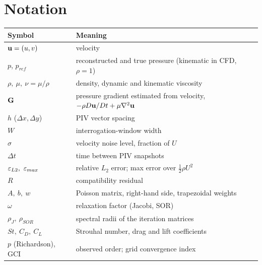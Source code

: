 \chapter{Notation}
\begin{table}[H]\centering\small
\begin{tabular}{@{}ll@{}}\toprule
Symbol & Meaning\\\midrule
$\mathbf{u}=(u,v)$ & velocity\\
$p$, $p_{ref}$ & reconstructed and true pressure (kinematic in CFD, $\rho=1$)\\
$\rho,\ \mu,\ \nu=\mu/\rho$ & density, dynamic and kinematic viscosity\\
$\mathbf{G}$ & pressure gradient estimated from velocity, $-\rho D\mathbf{u}/Dt+\mu\nabla^2\mathbf{u}$\\
$h$ ($\Delta x,\Delta y$) & PIV vector spacing\\
$W$ & interrogation-window width\\
$\sigma$ & velocity noise level, fraction of $U$\\
$\Delta t$ & time between PIV snapshots\\
$\eps_{L2},\ \eps_{max}$ & relative $L_2$ error; max error over $\tfrac12\rho U^2$\\
$R$ & compatibility residual\\
$A,\ b,\ w$ & Poisson matrix, right-hand side, trapezoidal weights\\
$\omega$ & relaxation factor (Jacobi, SOR)\\
$\rho_J,\ \rho_{SOR}$ & spectral radii of the iteration matrices\\
$St,\ C_D,\ C_L$ & Strouhal number, drag and lift coefficients\\
$p$ (Richardson), GCI & observed order; grid convergence index\\\bottomrule
\end{tabular}\end{table}

